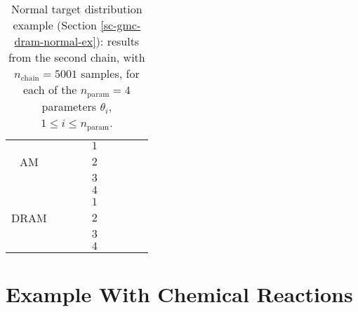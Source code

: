\begin{table}[h!]
\begin{center}
\begin{tabular}{|c|c|c|c|c|c|c|c|c|}
\hline
\hline
       &          &                        &                        & $1$ &                          &                                &                        &                               \\
\cline{5-9}
AM     &          &                        &                        & $2$ &                          &                                &                        &                               \\
\cline{5-9}
       &          &                        &                        & $3$ &                          &                                &                        &                               \\
\cline{5-9}
       &          &                        &                        & $4$ &                          &                                &                        &                               \\
\hline
\hline
       &          &                        &                        & $1$ &                          &                                &                        &                               \\
\cline{5-9}
DRAM   &          &                        &                        & $2$ &                          &                                &                        &                               \\
\cline{5-9}
       &          &                        &                        & $3$ &                          &                                &                        &                               \\
\cline{5-9}
       &          &                        &                        & $4$ &                          &                                &                        &                               \\
\hline
\end{tabular}
\caption{Normal target distribution example (Section \ref{sc-gmc-dram-normal-ex}):
results from the second chain, with $n_{\text{chain}}=5001$ samples,
for each of the $n_{\text{param}}=4$ parameters $\theta_i$, $1\leqslant i\leqslant n_{\text{param}}$.
}
\label{tab-dram-normal-ex-results-2}
\end{center}
\end{table}

\clearpage

\section{Example With Chemical Reactions}\label{sc-gmc-dram-chem-ex}

